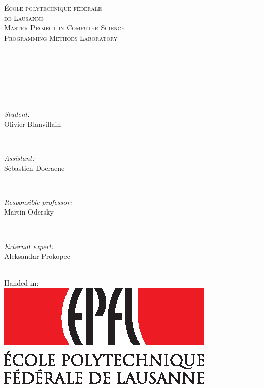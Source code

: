 \begin{titlepage}

\newcommand{\HRule}{\rule{\linewidth}{0.5mm}}
\newcommand{\person}[2]{
  \begin{minipage}{0.32\textwidth}
    \begin{flushleft} \large
      \emph{#1:}\\
      #2
    \end{flushleft}
  \end{minipage}
  \\[0.7cm]
}

\center
 
\textsc{\LARGE École polytechnique fédérale\\de Lausanne}\\[1cm]
\textsc{\Large Master Project in Computer Science}\\[0.2cm]
\textsc{\large Programming Methods Laboratory }\\[0.5cm]

\HRule \\[0.5cm]
{\huge \bfseries \thetitle}\\[0.2cm]
\HRule \\[1cm]

\person{Student}{Olivier Blanvillain}
\person{Assistant}{Sébastien Doeraene}
\person{Responsible professor}{Martin Odersky}
\person{External expert}{Aleksandar Prokopec}

\vspace{0.25cm}
{\large Handed in: \thedate}
\\[1.15cm]

\includegraphics{epfl.eps}

\vfill

\end{titlepage}

\begin{titlepage}
~\vfill
\end{titlepage}
